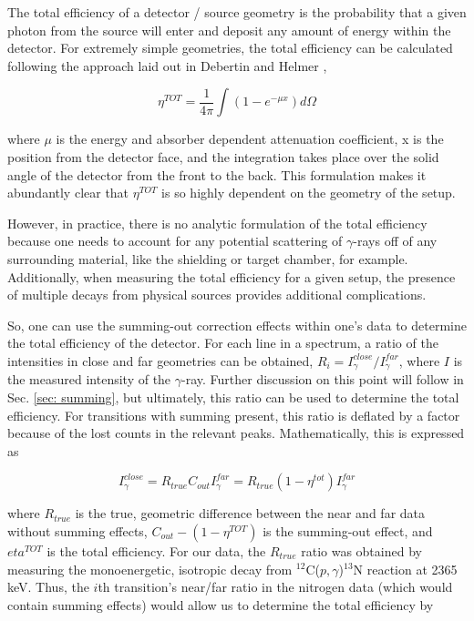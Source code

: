 The total efficiency of a detector / source geometry is the probability that a given photon from the source will enter and deposit any amount of energy within the detector. For extremely simple geometries, the total efficiency can be calculated following the approach laid out in Debertin and Helmer \cite{DebertinHelmerBook},

\begin{equation}
\eta^{TOT} = \dfrac{1}{4\pi} \int \left(1 - e^{-\mu x} \right) d\Omega
\end{equation}

\noindent where $\mu$ is the energy and absorber dependent attenuation coefficient, x is the position from the detector face, and the integration takes place over the solid angle of the detector from the front to the back. This formulation makes it abundantly clear that $\eta^{TOT}$ is so highly dependent on the geometry of the setup. 

However, in practice, there is no analytic formulation of the total efficiency because one needs to account for any potential scattering of $\gamma$-rays off of any surrounding material, like the shielding or target chamber, for example. Additionally, when measuring the total efficiency for a given setup, the presence of multiple decays from physical sources provides additional complications.

So, one can use the summing-out correction effects within one's data to determine the total efficiency of the detector. For each line in a spectrum, a ratio of the intensities in close and far geometries can be obtained, $R_{i} = I_{\gamma}^{close} / I_{\gamma}^{far}$, where $I$ is the measured intensity of the $\gamma$-ray. Further discussion on this point will follow in Sec. \ref{sec: summing}, but ultimately, this ratio can be used to determine the total efficiency. For transitions with summing present, this ratio is deflated by a factor because of the lost counts in the relevant peaks. Mathematically, this is expressed as

\begin{equation}
I_{\gamma}^{close} = R_{true} C_{out} I_{\gamma}^{far} = R_{true} (1-\eta^{tot}) I_{\gamma}^{far}
\end{equation}

\noindent where $R_{true}$ is the true, geometric difference between the near and far data without summing effects, $C_{out}-(1-\eta^{TOT})$ is the summing-out effect, and $eta^{TOT}$ is the total efficiency. For our data, the $R_{true}$ ratio was obtained by measuring the monoenergetic, isotropic decay from $^{12}$C($p, \gamma$)$^{13}$N reaction at 2365 keV. Thus, the $i$th transition's near/far ratio in the nitrogen data (which would contain summing effects) would allow us to determine the total efficiency by 

